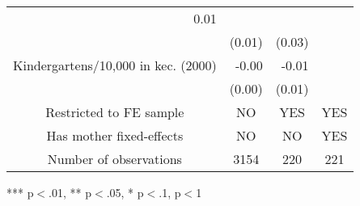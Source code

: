 \begin{tabular}{llll}
  \multicolumn{1}{r}{0.01 } &
  \multicolumn{1}{r}{} \\
\multicolumn{1}{l}{} &
  \multicolumn{1}{r}{(0.01)} &
  \multicolumn{1}{r}{(0.03)} &
  \multicolumn{1}{r}{} \\
\multicolumn{1}{l}{Kindergartens/10,000 in kec. (2000)} &
  \multicolumn{1}{r}{-0.00 } &
  \multicolumn{1}{r}{-0.01 } &
  \multicolumn{1}{r}{} \\
\multicolumn{1}{l}{} &
  \multicolumn{1}{r}{(0.00)} &
  \multicolumn{1}{r}{(0.01)} &
  \multicolumn{1}{r}{} \\
\multicolumn{1}{c}{Restricted to FE sample} &
  \multicolumn{1}{c}{NO} &
  \multicolumn{1}{c}{YES} &
  \multicolumn{1}{c}{YES} \\
\multicolumn{1}{c}{Has mother fixed-effects} &
  \multicolumn{1}{c}{NO} &
  \multicolumn{1}{c}{NO} &
  \multicolumn{1}{c}{YES} \\
\multicolumn{1}{c}{Number of observations} &
  \multicolumn{1}{c}{3154} &
  \multicolumn{1}{c}{220} &
  \multicolumn{1}{c}{221} \\
\cline{1-4}
\end{tabular}

\footnotesize{
*** p$<$.01, ** p$<$.05, * p$<$.1,  p$<$1
}
